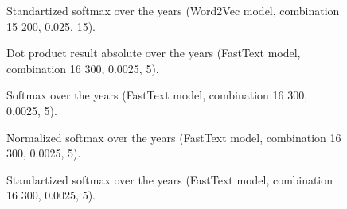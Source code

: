 \documentclass[10pt,letterpaper]{article}
\begin{document}
\begin{figure}[!ht]
    \centering
    \caption{Standartized softmax over the years (Word2Vec model, combination 15 {200, 0.025, 15}).}
    \label{fig:softmax_standartization_w2v_comb15}
\end{figure}

\begin{figure}[!ht]
    \centering
    \caption{Dot product result absolute over the years (FastText model, combination 16 {300, 0.0025, 5}).}
    \label{fig:dp_absolute_ft_comb16}
\end{figure}

\begin{figure}[!ht]
    \centering
    \caption{Softmax over the years (FastText model, combination 16 {300, 0.0025, 5}).}
    \label{fig:softmax_ft_comb16}
\end{figure}

\begin{figure}[!ht]
    \centering
    \caption{Normalized softmax over the years (FastText model, combination 16 {300, 0.0025, 5}).}
    \label{fig:softmax_normalization_ft_comb16}
\end{figure}

\begin{figure}[!ht]
    \centering
    \caption{Standartized softmax over the years (FastText model, combination 16 {300, 0.0025, 5}).}
    \label{fig:softmax_standartization_ft_comb16}
\end{figure}
\end{document}
